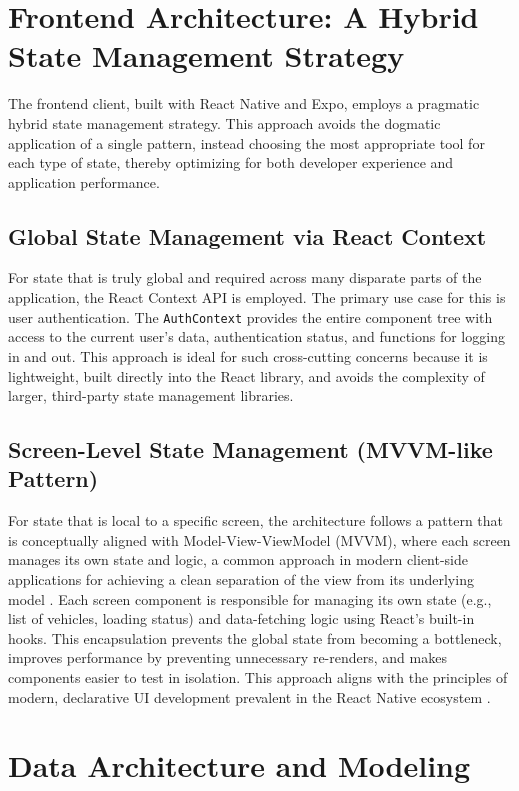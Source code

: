 \section{Frontend Architecture: A Hybrid State Management Strategy}

The frontend client, built with React Native and Expo, employs a pragmatic hybrid state management strategy. This approach avoids the dogmatic application of a single pattern, instead choosing the most appropriate tool for each type of state, thereby optimizing for both developer experience and application performance.

\subsection{Global State Management via React Context}
For state that is truly global and required across many disparate parts of the application, the React Context API is employed. The primary use case for this is user authentication. The \texttt{AuthContext} provides the entire component tree with access to the current user's data, authentication status, and functions for logging in and out. This approach is ideal for such cross-cutting concerns because it is lightweight, built directly into the React library, and avoids the complexity of larger, third-party state management libraries.

\subsection{Screen-Level State Management (MVVM-like Pattern)}
For state that is local to a specific screen, the architecture follows a pattern that is conceptually aligned with Model-View-ViewModel (MVVM), where each screen manages its own state and logic, a common approach in modern client-side applications for achieving a clean separation of the view from its underlying model \cite{Garg2013ComparingPatterns}. Each screen component is responsible for managing its own state (e.g., list of vehicles, loading status) and data-fetching logic using React's built-in hooks. This encapsulation prevents the global state from becoming a bottleneck, improves performance by preventing unnecessary re-renders, and makes components easier to test in isolation. This approach aligns with the principles of modern, declarative UI development prevalent in the React Native ecosystem \cite{Djirdeh2018FullstackReactNative}.

\section{Data Architecture and Modeling}


